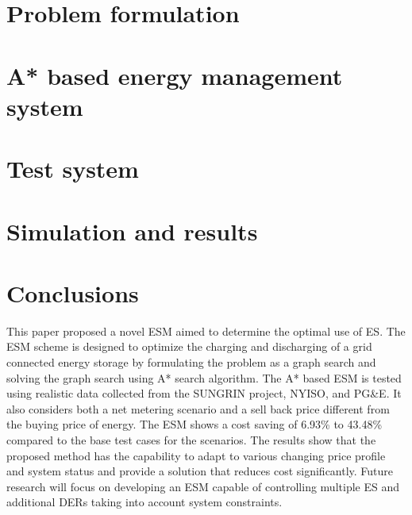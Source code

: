 \documentclass[journal]{IEEEtran}
\begin{document}
\section{Problem formulation}
\label{formulation}


\section{A* based energy management system} \label{A*}




\section{Test system} \label{sys}


\section{Simulation and results}



\section{Conclusions}
This paper proposed a novel ESM aimed to determine the optimal use of ES. The ESM scheme is designed to optimize the charging and discharging of a grid connected energy storage by formulating the problem as a graph search and solving the graph search using A* search algorithm. The A* based ESM is tested using realistic data collected from the SUNGRIN project, NYISO, and PG\&E. It also considers both a net metering scenario and a sell back price different from the buying price of energy. The ESM shows a cost saving of 6.93\% to 43.48\% compared to the base test cases for the scenarios. The results show that the proposed method has the capability to adapt to various changing price profile and system status and provide a solution that reduces cost significantly. Future research will focus on developing an ESM capable of controlling multiple ES and additional  DERs taking into account system constraints.







\ifCLASSOPTIONcaptionsoff
  \newpage
\fi
\end{document}
